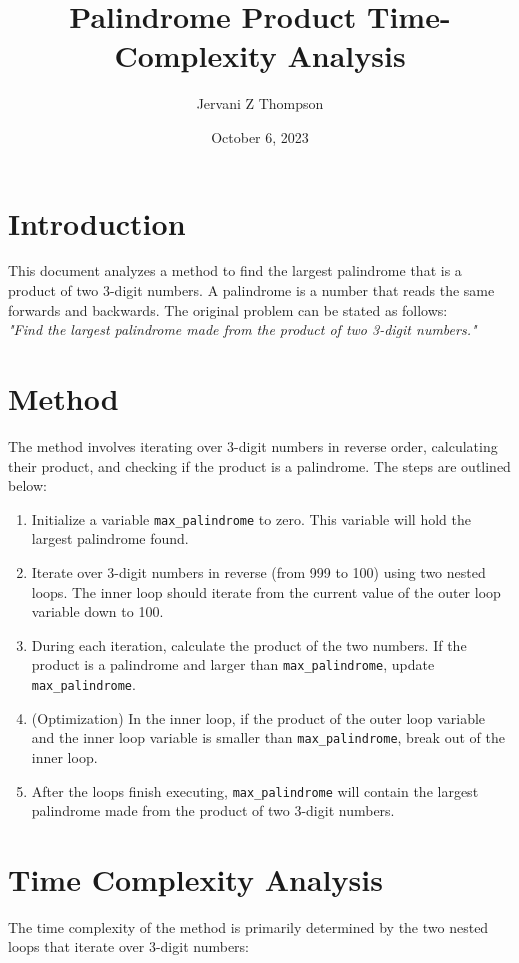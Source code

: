 \documentclass{article}
\title{Palindrome Product Time-Complexity Analysis}
\author{Jervani Z Thompson}
\date{October 6, 2023}
\begin{document}
\maketitle

\section*{Introduction}
This document analyzes a method to find the largest palindrome that is a product of two 3-digit numbers. A palindrome is a number that reads the same forwards and backwards. The original problem can be stated as follows:\\

\textit{"Find the largest palindrome made from the product of two 3-digit numbers."}

\section*{Method}
The method involves iterating over 3-digit numbers in reverse order, calculating their product, and checking if the product is a palindrome. The steps are outlined below:

\begin{enumerate}
    \item Initialize a variable \texttt{max\_palindrome} to zero. This variable will hold the largest palindrome found.
    \item Iterate over 3-digit numbers in reverse (from 999 to 100) using two nested loops. The inner loop should iterate from the current value of the outer loop variable down to 100.
    \item During each iteration, calculate the product of the two numbers. If the product is a palindrome and larger than \texttt{max\_palindrome}, update \texttt{max\_palindrome}.
    \item (Optimization) In the inner loop, if the product of the outer loop variable and the inner loop variable is smaller than \texttt{max\_palindrome}, break out of the inner loop.
    \item After the loops finish executing, \texttt{max\_palindrome} will contain the largest palindrome made from the product of two 3-digit numbers.
\end{enumerate}

\section*{Time Complexity Analysis}
The time complexity of the method is primarily determined by the two nested loops that iterate over 3-digit numbers:
\end{document}

